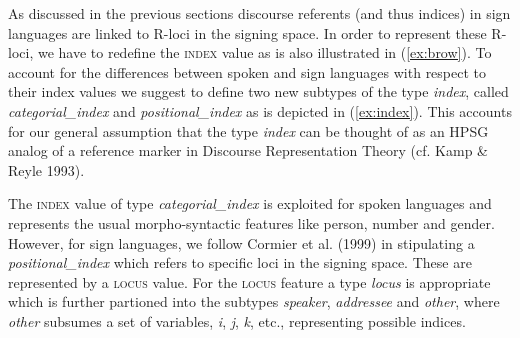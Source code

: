 \documentclass[11pt,a4paper,fleqn]{article}
\begin{document}
\begin{exe}
\ex  \label{ex:brow}
\end{exe}

As discussed in the previous sections discourse referents (and thus indices) in sign languages are linked to R-loci in the signing space. In order to represent these R-loci, we have to redefine the \textsc{index} value as is also illustrated in (\ref{ex:brow}). To account for the differences between spoken and sign languages with respect to their index values we suggest to define two new subtypes of the type \textit{index}, called \textit{categorial\_index}  and \textit{positional\_index} as is depicted in (\ref{ex:index}). This accounts for our general assumption that the type \textit{index} can be thought of as an HPSG analog of a reference marker in Discourse Representation Theory (cf. Kamp \& Reyle 1993).

\begin{exe}
\ex  \label{ex:index}
\begin{xlist}
\ex
{}

\ex
{}
\end{xlist}
\end{exe}

The \textsc{index} value of type \textit{categorial\_index} is exploited for spoken languages and represents the usual morpho-syntactic features like person, number and gender. However, for sign languages, we follow Cormier et al. (1999) in stipulating a \textit{positional\_index} which refers to specific loci in the signing space. These are represented by a \textsc{locus} value. For the \textsc{locus} feature a type \textit{locus} is appropriate which is further partioned into the subtypes \textit{speaker}, \textit{addressee} and \textit{other}, where \textit{other} subsumes a set of variables, \textit{i}, \textit{j}, \textit{k}, etc., representing possible indices. 
\end{document}
